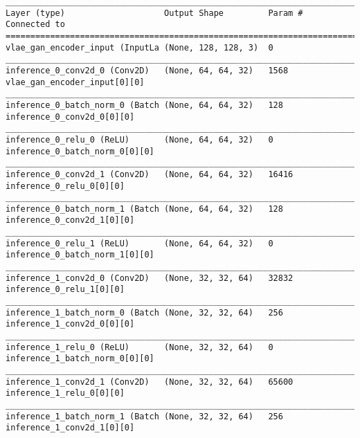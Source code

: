 \begin{lstlisting}[caption={CelebA-VLAE-GAN Encoder},captionpos=b,basicstyle=\tiny, label={lst:mnist-vlae-gan-encoder}]
__________________________________________________________________________________________________
Layer (type)                    Output Shape         Param #     Connected to
==================================================================================================
vlae_gan_encoder_input (InputLa (None, 128, 128, 3)  0
__________________________________________________________________________________________________
inference_0_conv2d_0 (Conv2D)   (None, 64, 64, 32)   1568        vlae_gan_encoder_input[0][0]
__________________________________________________________________________________________________
inference_0_batch_norm_0 (Batch (None, 64, 64, 32)   128         inference_0_conv2d_0[0][0]
__________________________________________________________________________________________________
inference_0_relu_0 (ReLU)       (None, 64, 64, 32)   0           inference_0_batch_norm_0[0][0]
__________________________________________________________________________________________________
inference_0_conv2d_1 (Conv2D)   (None, 64, 64, 32)   16416       inference_0_relu_0[0][0]
__________________________________________________________________________________________________
inference_0_batch_norm_1 (Batch (None, 64, 64, 32)   128         inference_0_conv2d_1[0][0]
__________________________________________________________________________________________________
inference_0_relu_1 (ReLU)       (None, 64, 64, 32)   0           inference_0_batch_norm_1[0][0]
__________________________________________________________________________________________________
inference_1_conv2d_0 (Conv2D)   (None, 32, 32, 64)   32832       inference_0_relu_1[0][0]
__________________________________________________________________________________________________
inference_1_batch_norm_0 (Batch (None, 32, 32, 64)   256         inference_1_conv2d_0[0][0]
__________________________________________________________________________________________________
inference_1_relu_0 (ReLU)       (None, 32, 32, 64)   0           inference_1_batch_norm_0[0][0]
__________________________________________________________________________________________________
inference_1_conv2d_1 (Conv2D)   (None, 32, 32, 64)   65600       inference_1_relu_0[0][0]
__________________________________________________________________________________________________
inference_1_batch_norm_1 (Batch (None, 32, 32, 64)   256         inference_1_conv2d_1[0][0]

\end{lstlisting}
